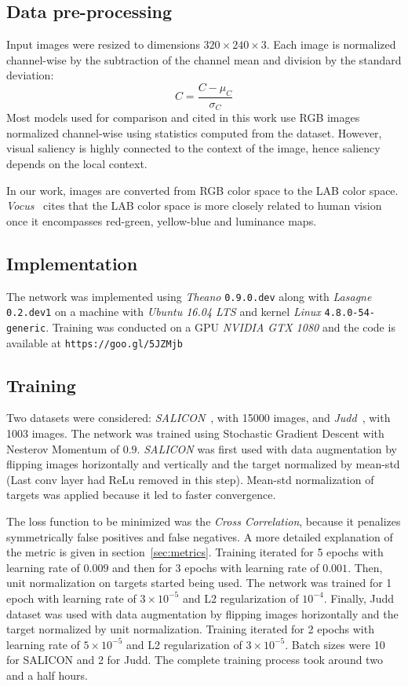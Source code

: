 \documentclass[journal]{IEEEtran}
\begin{document}
\subsection{Data pre-processing}
Input images were resized to dimensions $320\times240\times3$.
Each image is normalized channel-wise by the subtraction of
the channel mean and division by the standard deviation:
$$C = \frac{C - \mu_C}{\sigma_C}$$
Most models used for comparison and cited in this work use RGB images
normalized channel-wise using statistics computed from the dataset.
However, visual saliency is highly connected to the context of the
image, hence saliency depends on the local context.

In our work, images are converted from RGB color space to the LAB color
space.
\emph{Vocus}~\cite{frintrop_2005} cites that the
LAB color space is more closely related to human vision once it encompasses
red-green, yellow-blue and
luminance maps.

\subsection{Implementation}
The network was implemented using \emph{Theano} \texttt{0.9.0.dev}
along with \emph{Lasagne} \texttt{0.2.dev1}
on a machine with \emph{Ubuntu 16.04 LTS} and
kernel \emph{Linux} \texttt{4.8.0-54-generic}.
Training was conducted on a GPU \emph{NVIDIA GTX 1080} and the
code is available at \texttt{https://goo.gl/5JZMjb}

\subsection{Training}
Two datasets were considered:
\emph{SALICON}~\cite{jiang_2015}, with 15000 images, and
\emph{Judd}~\cite{judd}, with 1003 images.
The network was trained using Stochastic Gradient Descent with Nesterov
Momentum of $0.9$.
\emph{SALICON} was first used with data augmentation by flipping images
horizontally and vertically and the target normalized by mean-std
(Last conv layer had ReLu removed in this step).
Mean-std normalization of targets was applied because it led to faster
convergence.

The loss function to be minimized was the \emph{Cross Correlation},
because it penalizes symmetrically false positives and false negatives.
A more detailed explanation of the metric is given in
section~\ref{sec:metrics}.
Training iterated for 5 epochs with learning rate of $0.009$
and then for 3 epochs with learning rate of $0.001$.
Then, unit normalization on targets started being used.
The network was trained for 1 epoch with learning rate of
$3\times10^{-5}$ and L2 regularization of $10^{-4}$. Finally, Judd dataset was used with data augmentation by flipping images horizontally and the target normalized by unit normalization.
Training iterated for 2 epochs with learning rate of
$5\times10^{-5}$ and L2 regularization of $3\times10^{-5}$. Batch sizes were 10 for SALICON and 2 for Judd. The complete training process took around two and a half hours.
\end{document}

